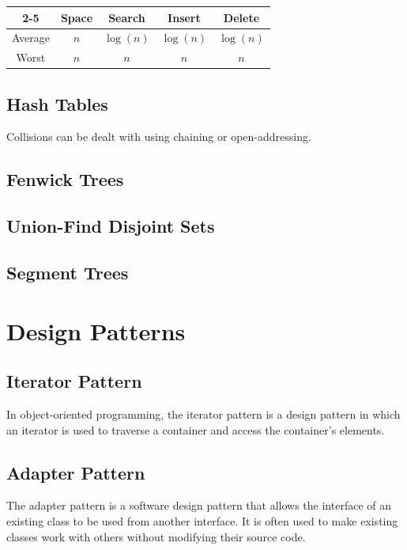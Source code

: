 \documentclass[a4paper, 12pt]{article}
\begin{document}
\begin{center}	
\begin{tabular}{| c | c | c | c | c |}
\cline{2-5}
\multicolumn{1}{c |}{} & Space & Search & Insert & Delete \\
\hline
Average & $n$ & $\log(n)$ & $\log(n)$ & $\log(n)$ \\
\hline
Worst & $n$ & $n$ & $n$ & $n$ \\
\hline
\end{tabular}
\end{center}
	
	\subsection{Hash Tables}

Collisions can be dealt with using chaining or open-addressing.

  \subsection{Fenwick Trees}

  \subsection{Union-Find Disjoint Sets}

  \subsection{Segment Trees}
	
\section{Design Patterns}

	\subsection{Iterator Pattern}
	
In object-oriented programming, the iterator pattern is a design pattern in which an iterator is used to traverse a container and access the container's elements.

	\subsection{Adapter Pattern}
	
The adapter pattern is a software design pattern that allows the interface of an existing class to be used from another interface. It is often used to make existing classes work with others without modifying their source code.
\end{document}
